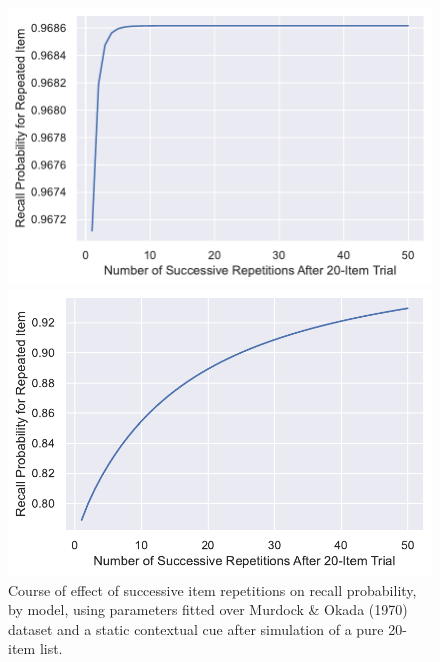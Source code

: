 \documentclass[
  letterpaper,
  DIV=11,
  numbers=noendperiod]{scrreport}
\begin{document}
\begin{figure}

\begin{minipage}[c]{0.50\linewidth}

{\centering 

\includegraphics{./figures/cmr_repeffect.pdf}

}

\end{minipage}%
%
\begin{minipage}[c]{0.50\linewidth}

{\centering 

\includegraphics{./figures/icmr_repeffect.pdf}

}

\end{minipage}%

\caption{\label{fig-repeffect}Course of effect of successive item
repetitions on recall probability, by model, using parameters fitted
over Murdock \& Okada (1970) dataset and a static contextual cue after
simulation of a pure 20-item list.}

\end{figure}
\end{document}
